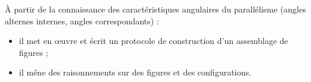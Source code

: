 \begin{prerequis}[Objectifs de 5\up{e}]    
    À partir de la connaissance des caractéristiques angulaires du parallélisme (angles alternes internes, angles correspondants) :
    \begin{itemize}
        \columnbreak
        \item il met en \oe uvre et écrit un protocole de construction d'un assemblage de figures ;        
        \item il mêne des raisonnements sur des figures et des configurations.
    \end{itemize}
\end{prerequis}
